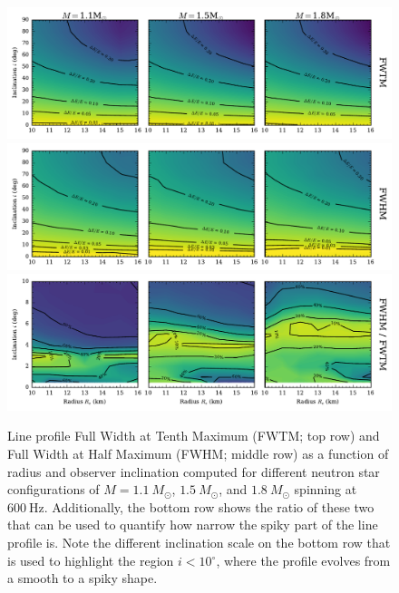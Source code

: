 \documentclass{aa}
\newcommand{\Msun}{\ensuremath{M_{\odot}}}
\renewcommand{\deg}{\ensuremath{^{\circ}}}
\begin{document}
\begin{figure}[htbp!]
\centering
    \includegraphics[width=18cm]{figs/fwhm_full.pdf}
    \includegraphics[width=18cm]{figs/fwhm_abs.pdf}
    \includegraphics[width=18cm]{figs/fwhm_rel.pdf}
\caption{\label{fig:fwhm}
    Line profile Full Width at Tenth Maximum (FWTM; top row) and Full Width at Half Maximum (FWHM; middle row) as a function of radius and observer inclination computed for different neutron star configurations of $M=1.1~\Msun$, $1.5~\Msun$, and $1.8~\Msun$ spinning at $600~\mathrm{Hz}$.
    Additionally, the bottom row shows the ratio of these two that can be used to quantify how narrow the spiky part of the line profile is.
    Note the different inclination scale on the bottom row that is used to highlight the region $i < 10\deg$, where the profile evolves from a smooth to a spiky shape.
}
\end{figure}
\end{document}
